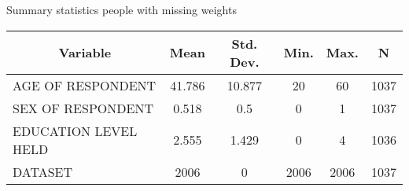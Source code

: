 
\begin{threeparttable}[htbp]\centering \caption{Summary statistics people with missing weights \label{sumstat}}
\begin{tabular}{l c c c c c}\hline\hline
\multicolumn{1}{c}{\textbf{Variable}} & \textbf{Mean}
 & \textbf{Std. Dev.}& \textbf{Min.} &  \textbf{Max.} & \textbf{N}\\ \hline
AGE OF RESPONDENT & 41.786 & 10.877 & 20 & 60 & 1037\\
SEX OF RESPONDENT & 0.518 & 0.5 & 0 & 1 & 1037\\
EDUCATION LEVEL HELD & 2.555 & 1.429 & 0 & 4 & 1036\\
DATASET & 2006 & 0 & 2006 & 2006 & 1037\\
\hline\end{tabular}\end{threeparttable}
